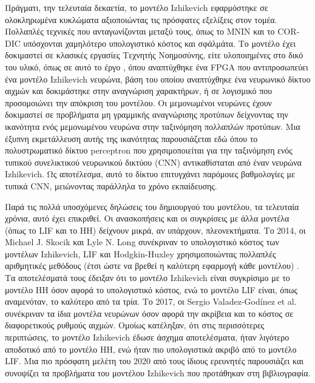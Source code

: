 \documentclass[12pt]{report}
\begin{document}
Πράγματι, την τελευταία δεκαετία, το μοντέλο \textlatin{Izhikevich} εφαρμόστηκε σε ολοκληρωμένα κυκλώματα αξιοποιώντας τις πρόσφατες εξελίξεις στον τομέα. Πολλαπλές τεχνικές που ανταγωνίζονται μεταξύ τους, όπως το \textlatin{MNIN} \cite{Haghiri2018} και το \textlatin{CORDIC} \cite{Elnabawy2018} υπόσχονται χαμηλότερο υπολογιστικό κόστος και σφάλμάτα. Το μοντέλο έχει δοκιμαστεί σε κλασικές εργασίες Τεχνητής Νοημοσύνης, είτε υλοποιημένες στο δικό του υλικό, όπως σε αυτό το έργο \cite{Rice2009}, όπου αναπτύχθηκε ένα \textlatin{FPGA} που αντιπροσωπεύει ένα μοντέλο  \textlatin{Izhikevich} νευρώνα, βάση του οποίου αναπτύχθηκε ένα νευρωνικό δίκτυο αιχμών και δοκιμάστηκε στην αναγνώριση χαρακτήρων, ή σε λογισμικό που προσομοιώνει την απόκριση του μοντέλου. Οι μεμονωμένοι νευρώνες έχουν δοκιμαστεί σε προβλήματα μη γραμμικής αναγνώρισης προτύπων \cite{Antonio2010} δείχνοντας την ικανότητα ενός μεμονωμένου νευρώνα στην ταξινόμηση πολλαπλών προτύπων. Μια έξυπνη εκμετάλλευση αυτής της ικανότητας παρουσιάζεται εδώ \cite{luna-a2019} όπου το πολυστρωματικό δίκτυο \textlatin{perceptron} που χρησιμοποιείται για την ταξινόμηση ενός τυπικού συνελικτικού νευρωνικού δικτύου (\textlatin{CNN}) αντικαθίσταται από έναν νευρώνα \textlatin{Izhikevich}. Ως αποτέλεσμα, αυτό το δίκτυο επιτυγχάνει παρόμοιες βαθμολογίες με τυπικά \textlatin{CNN}, μειώνοντας παράλληλα το χρόνο εκπαίδευσης.

Παρά τις πολλά υποσχόμενες δηλώσεις του δημιουργού του μοντέλου, τα τελευταία χρόνια, αυτό έχει επικριθεί. Οι ανασκοπήσεις και οι συγκρίσεις με άλλα μοντέλα (όπως το \textlatin{LIF} και το \textlatin{HH}) δείχνουν μικρά, αν υπάρχουν, πλεονεκτήματα. Το 2014, οι \textlatin{Michael J. Skocik} και \textlatin{Lyle N. Long} συνέκριναν το υπολογιστικό κόστος των μοντέλων \textlatin{Izhikevich, LIF} και \textlatin{Hodgkin-Huxley} χρησιμοποιώντας πολλαπλές αριθμητικές μεθόδους (έτσι ώστε να βρεθεί η καλύτερη εφαρμογή κάθε μοντέλου) \cite{Skocik2014}. Τα αποτελέσματά τους έδειξαν ότι το μοντέλο \textlatin{Izhikevich} είναι συγκρίσιμο με το μοντέλο \textlatin{HH} όσον αφορά το υπολογιστικό κόστος, ενώ το μοντέλο \textlatin{LIF} είναι, όπως αναμενόταν, το καλύτερο από τα τρία. Το 2017, οι \textlatin{Sergio Valadez-Godínez et al.} \cite{Godinez2017} συνέκριναν τα ίδια μοντέλα νευρώνων όσον αφορά την ακρίβεια και το κόστος σε διαφορετικούς ρυθμούς αιχμών. Ομοίως κατέληξαν, ότι στις περισσότερες περιπτώσεις, το μοντέλο \textlatin{Izhikevich} έδωσε άσχημα αποτελέσματα, ήταν λιγότερο αποδοτικό από το μοντέλο \textlatin{HH}, ενώ ήταν πιο υπολογιστικά ακριβό από το μοντέλο \textlatin{LIF}. Μια πιο πρόσφατη μελέτη του 2020 από τους ίδιους ερευνητές \cite{Valadez-Godinez2020} παρουσιάζει και συνοψίζει τα προβλήματα του μοντέλου \textlatin{Izhikevich} που προτάθηκαν στη βιβλιογραφία.
\end{document}
